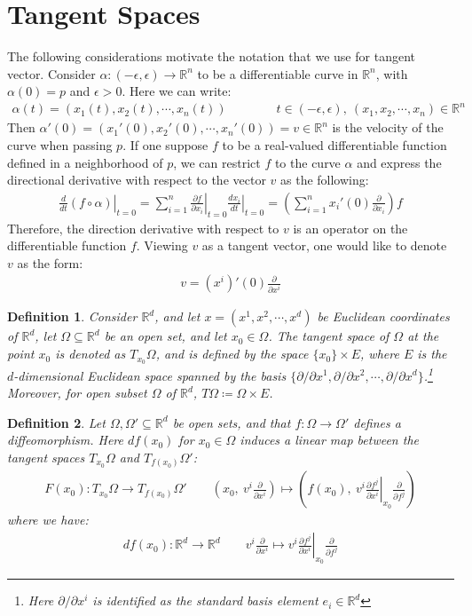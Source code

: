 \documentclass[11pt]{book}
\theoremstyle{break}
\theoremstyle{break}
\newtheorem{defn}{Definition}[corL]
\newcommand{\R}{\mathbb{R}}
\newcommand{\pd}{\partial}
\begin{document}
\newpage
\section[Tangent Spaces]{\color{red}Tangent Spaces\color{black}}
The following considerations motivate the notation that we use for tangent vector. Consider $\alpha:(-\epsilon,\epsilon) \to \R^n$ to be a differentiable curve in $\R^n$, with $\alpha(0) = p$ and $\epsilon>0$. Here we can write:
\begin{align*}
\alpha(t) = (x_1(t), x_2(t),\cdots, x_n(t)) \qquad\qquad t\in (-\epsilon, \epsilon), \ (x_1,x_2,\cdots, x_n) \in \R^n
\end{align*}
Then $\alpha'(0) = (x_1'(0),x_2'(0),\cdots, x_n'(0)) = v \in \R^n$ is the velocity of the curve when passing $p$. If one suppose $f$ to be a real-valued differentiable function defined in a neighborhood of $p$, we can restrict $f$ to the curve $\alpha$ and express the directional derivative with respect to the vector $v$ as the following:
\begin{align*}
\left.\frac{d}{dt}(f\circ \alpha) \right|_{t = 0} = \sum_{i=1}^n \left.\frac{\pd f}{\pd x_i}\right|_{t=0} \left.\frac{dx_i}{dt}\right|_{t=0} = \left( \sum_{i=1}^n x_i'(0) \frac{\pd}{\pd x_i}\right) f
\end{align*}  
Therefore, the direction derivative with respect to $v$ is an operator on the differentiable function $f$. Viewing $v$ as a tangent vector, one would like to denote $v$ as the form:
\begin{align*}
v =  (x^i)'(0) \frac{\pd}{\pd x^i}
\end{align*}


\begin{defn}
Consider $\R^d$, and let $x = (x^1,x^2,\cdots, x^d)$ be Euclidean coordinates of $\R^d$, let $\Omega \subseteq \R^d$ be an open set, and let $x_0 \in \Omega$. The tangent space of $\Omega$ at the point $x_0$ is denoted as $T_{x_0}\Omega$, and is defined by the space $\{x_0\}\times E$, where $E$ is the $d$-dimensional Euclidean space spanned by the basis $\{ \pd/\pd x^1, \pd/\pd x^2, \cdots, \pd/\pd x^d\}$.\footnote{Here $\pd/\pd x^i$ is identified as the standard basis element $e_i \in \R^d$} Moreover, for open subset $\Omega$ of $\R^d$, $T\Omega \coloneqq \Omega \times E $.
\end{defn}

\begin{defn}
Let $\Omega,\Omega' \subseteq \R^d$ be open sets, and that $f:\Omega \to \Omega'$ defines a diffeomorphism. Here $df(x_0)$ for $x_0 \in \Omega$ induces a linear map between the tangent spaces $T_{x_0}\Omega$ and $T_{f(x_0)}\Omega'$:
\begin{align*}
F(x_0): T_{x_0}\Omega \to T_{f(x_0)}\Omega' \qquad \left(x_0,\ v^i \frac{\pd}{\pd x^i}\right)\mapsto \left(f(x_0),\ v^i \left.\frac{\pd f^j}{\pd x^i}\right|_{x_0} \frac{\pd }{\pd f^j}\right)
\end{align*}
where we have:
\begin{align*}
df(x_0): \R^d \to \R^d \qquad v^i \frac{\pd}{\pd x^i}\mapsto v^i \left.\frac{\pd f^j}{\pd x^i}\right|_{x_0} \frac{\pd }{\pd f^j}
\end{align*}
\end{defn}
\end{document}
